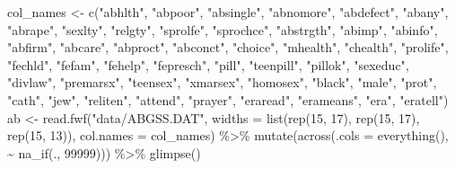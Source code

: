 \documentclass[
]{book}
\newenvironment{Shaded}{\begin{snugshade}}{\end{snugshade}}
\newcommand{\AttributeTok}[1]{\textcolor[rgb]{0.77,0.63,0.00}{#1}}
\newcommand{\DecValTok}[1]{\textcolor[rgb]{0.00,0.00,0.81}{#1}}
\newcommand{\FunctionTok}[1]{\textcolor[rgb]{0.00,0.00,0.00}{#1}}
\newcommand{\NormalTok}[1]{#1}
\newcommand{\OtherTok}[1]{\textcolor[rgb]{0.56,0.35,0.01}{#1}}
\newcommand{\SpecialCharTok}[1]{\textcolor[rgb]{0.00,0.00,0.00}{#1}}
\newcommand{\StringTok}[1]{\textcolor[rgb]{0.31,0.60,0.02}{#1}}
\begin{document}
\begin{Shaded}
\begin{Highlighting}[]
\NormalTok{col\_names }\OtherTok{\textless{}{-}} \FunctionTok{c}\NormalTok{(}\StringTok{"abhlth"}\NormalTok{, }\StringTok{"abpoor"}\NormalTok{, }\StringTok{"absingle"}\NormalTok{, }\StringTok{"abnomore"}\NormalTok{, }\StringTok{"abdefect"}\NormalTok{, }\StringTok{"abany"}\NormalTok{, }\StringTok{"abrape"}\NormalTok{, }\StringTok{"sexlty"}\NormalTok{,}
   \StringTok{"relgty"}\NormalTok{, }\StringTok{"sprolfe"}\NormalTok{, }\StringTok{"sprochce"}\NormalTok{, }\StringTok{"abstrgth"}\NormalTok{, }\StringTok{"abimp"}\NormalTok{, }\StringTok{"abinfo"}\NormalTok{, }\StringTok{"abfirm"}\NormalTok{, }
   \StringTok{"abcare"}\NormalTok{, }\StringTok{"abproct"}\NormalTok{, }\StringTok{"abconct"}\NormalTok{, }\StringTok{"choice"}\NormalTok{, }\StringTok{"mhealth"}\NormalTok{, }\StringTok{"chealth"}\NormalTok{, }\StringTok{"prolife"}\NormalTok{, }
   \StringTok{"fechld"}\NormalTok{, }\StringTok{"fefam"}\NormalTok{, }\StringTok{"fehelp"}\NormalTok{, }\StringTok{"fepresch"}\NormalTok{, }\StringTok{"pill"}\NormalTok{, }\StringTok{"teenpill"}\NormalTok{, }\StringTok{"pillok"}\NormalTok{, }
   \StringTok{"sexeduc"}\NormalTok{, }\StringTok{"divlaw"}\NormalTok{, }\StringTok{"premarsx"}\NormalTok{, }\StringTok{"teensex"}\NormalTok{, }\StringTok{"xmarsex"}\NormalTok{, }\StringTok{"homosex"}\NormalTok{, }\StringTok{"black"}\NormalTok{,  }
   \StringTok{"male"}\NormalTok{, }\StringTok{"prot"}\NormalTok{, }\StringTok{"cath"}\NormalTok{, }\StringTok{"jew"}\NormalTok{, }\StringTok{"reliten"}\NormalTok{, }\StringTok{"attend"}\NormalTok{, }\StringTok{"prayer"}\NormalTok{,}
   \StringTok{"eraread"}\NormalTok{, }\StringTok{"erameans"}\NormalTok{, }\StringTok{"era"}\NormalTok{, }\StringTok{"eratell"}\NormalTok{)}
\NormalTok{ab }\OtherTok{\textless{}{-}} \FunctionTok{read.fwf}\NormalTok{(}\StringTok{"data/ABGSS.DAT"}\NormalTok{, }
               \AttributeTok{widths =} \FunctionTok{list}\NormalTok{(}\FunctionTok{rep}\NormalTok{(}\DecValTok{15}\NormalTok{, }\DecValTok{17}\NormalTok{), }\FunctionTok{rep}\NormalTok{(}\DecValTok{15}\NormalTok{, }\DecValTok{17}\NormalTok{), }\FunctionTok{rep}\NormalTok{(}\DecValTok{15}\NormalTok{, }\DecValTok{13}\NormalTok{)),}
               \AttributeTok{col.names =}\NormalTok{ col\_names) }\SpecialCharTok{\%\textgreater{}\%}
  \FunctionTok{mutate}\NormalTok{(}\FunctionTok{across}\NormalTok{(}\AttributeTok{.cols =} \FunctionTok{everything}\NormalTok{(), }\SpecialCharTok{\textasciitilde{}} \FunctionTok{na\_if}\NormalTok{(.,  }\DecValTok{99999}\NormalTok{))) }\SpecialCharTok{\%\textgreater{}\%}
  \FunctionTok{glimpse}\NormalTok{()}
\end{Highlighting}
\end{Shaded}
\end{document}
